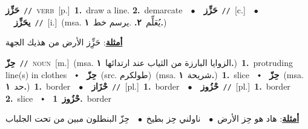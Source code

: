 \documentclass[10pt,a4paper,twoside]{article} %
\begin{document}
\begin{multicols}{2}
{\setlength\topsep{0pt}\textbf{\foreignlanguage{arabic}{حَزِّز}}\ {\color{gray}\texttt{//}\color{black}}\ \textsc{verb}\ [p.]\ \textbf{1.}~draw a line.  \textbf{2.}~demarcate\ \ $\bullet$\ \ \setlength\topsep{0pt}\textbf{\foreignlanguage{arabic}{حَزِّز}}\ {\color{gray}\texttt{//}\color{black}}\ [c.]\ \ $\bullet$\ \ \setlength\topsep{0pt}\textbf{\foreignlanguage{arabic}{يحَزِّز}}\ {\color{gray}\texttt{//}\color{black}}\ [i.]\ \color{gray}(msa. \foreignlanguage{arabic}{يُعَلِّم}~\foreignlanguage{arabic}{\textbf{٢.}}  .\foreignlanguage{arabic}{يرسم خط}~\foreignlanguage{arabic}{\textbf{١.}})\color{black}\  \begin{flushright}\color{gray}\foreignlanguage{arabic}{\textbf{\underline{\foreignlanguage{arabic}{أمثلة}}}: حَزِِّز الأرض من هذيك الجهة}\end{flushright}\color{black}} \vspace{2mm}

{\setlength\topsep{0pt}\textbf{\foreignlanguage{arabic}{حِزّ}}\ {\color{gray}\texttt{//}\color{black}}\ \textsc{noun}\ [m.]\ \color{gray}(msa. \foreignlanguage{arabic}{الزوايا البارزة من الثياب عند ارتدائها}~\foreignlanguage{arabic}{\textbf{١.}})\color{black}\ \textbf{1.}~protruding line(s) in clothes\ \ $\smblkdiamond$\ \ \setlength\topsep{0pt}\textbf{\foreignlanguage{arabic}{حِزّ}}\ (src. \color{gray}\foreignlanguage{arabic}{طولكرم}\color{black})\ \color{gray}(msa. \foreignlanguage{arabic}{شريحة}~\foreignlanguage{arabic}{\textbf{١.}})\color{black}\ \textbf{1.}~slice\ \ $\smblkdiamond$\ \ \setlength\topsep{0pt}\textbf{\foreignlanguage{arabic}{حِزّ}}\ \color{gray}(msa. \foreignlanguage{arabic}{حد}~\foreignlanguage{arabic}{\textbf{١.}})\color{black}\ \textbf{1.}~border\ \ $\bullet$\ \ \setlength\topsep{0pt}\textbf{\foreignlanguage{arabic}{حْزَاز}}\ {\color{gray}\texttt{//}\color{black}}\ [pl.]\ \textbf{1.}~border\ \ $\bullet$\ \ \setlength\topsep{0pt}\textbf{\foreignlanguage{arabic}{حْزُوز}}\ {\color{gray}\texttt{//}\color{black}}\ [pl.]\ \textbf{1.}~border  \textbf{2.}~slice\ \ $\smblkdiamond$\ \ \setlength\topsep{0pt}\textbf{\foreignlanguage{arabic}{حْزُوز}}\ \textbf{1.}~border\  \begin{flushright}\color{gray}\foreignlanguage{arabic}{\textbf{\underline{\foreignlanguage{arabic}{أمثلة}}}: هاد هو حِز الأرض\ $\bullet$\ \  ناولني حِز بطيخ\ $\bullet$\ \  حِزّ البنطلون مبين من تحت الجلباب}\end{flushright}\color{black}} \vspace{2mm}


\end{multicols}
\end{document}
